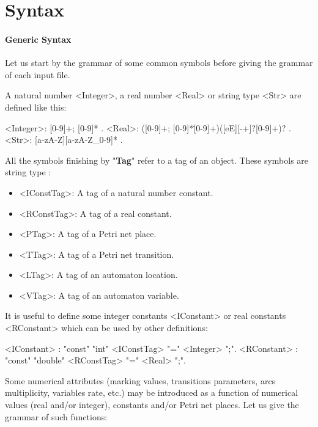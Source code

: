 \documentclass[a4paper]{article}
\begin{document}
 


\section{Syntax }
\label{syntax.cosmos}
\paragraph{Generic Syntax}
Let us start by the  grammar of some common symbols before giving the grammar of each input file.

A natural number <Integer>, a  real number <Real> or string type <Str> are defined like this:
\begin{grammar}
[(colon){$::=$ }]
[(semicolon){$|$ }]
[(period){\\ }]
[(quote){"}{" }]
[(nonterminal){$\langle$}{$\rangle$ }]
<Integer>: [0-9]+; [0-9]* .
<Real>:  ([0-9]+; [0-9]*\.[0-9]+)([eE][-+]?[0-9]+)? .
<Str>: [a-zA-Z][a-zA-Z\_0-9]* .
\end{grammar}

All the symbols finishing by "\textbf{Tag}" refer to a tag of an object. These symbols are string type :
\begin{itemize}
\item <IConstTag>: A tag of a natural number constant.
\item <RConstTag>: A tag of a real constant.
\item <PTag>: A tag of a Petri net place.
\item <TTag>: A tag of a Petri net transition.
\item <LTag>: A tag of an automaton location.
\item <VTag>: A tag of an automaton variable.
\end{itemize}


It is useful to define some integer constants <IConstant>  or real constants <RConstant> which can be used by other definitions:

\begin{grammar}
[(colon){$::=$ }]
[(semicolon){$|$ }]
[(period){\\ }]
[(quote){"}{" }]
[(nonterminal){$\langle$}{$\rangle$ }]
<IConstant> : "const" "int" <IConstTag> "=" <Integer> ";".
<RConstant> : "const" "double" <RConstTag> "=" <Real> ";".
\end{grammar}

Some numerical attributes (marking values, transitions parameters, arcs multiplicity, variables rate, etc.) may be introduced as  a function of 
numerical values (real and/or integer),  constants and/or Petri net places. Let us give the grammar of such functions:
\end{document}
